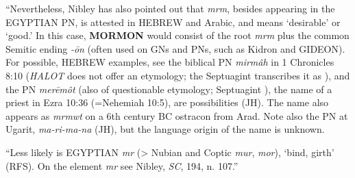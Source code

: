 			``Nevertheless, Nibley has also pointed out that \textit{mrm}, besides appearing in the \textsc{EGYPTIAN} PN, is attested in \textsc{HEBREW} and Arabic, and means `desirable' or `good.' In this case, \textbf{\textsc{MORMON}} would consist of the root \textit{mrm} plus the common Semitic ending \textit{-\={o}n} (often used on GNs and PNs, such as Kidron and \textsc{GIDEON}). For possible, \textsc{HEBREW} examples, see the biblical PN \textit{mirm\^{a}h} in 1 Chronicles 8:10 (\textit{HALOT} does not offer an etymology; the Septuagint transcribes it as ), and the PN \textit{mer\={e}m\^{o}t} (also of questionable etymology; Septuagint ), the name of a priest in Ezra 10:36 (=Nehemiah 10:5), are possibilities (JH). The name also appears as \textit{mrmwt} on a 6th century BC ostracon from Arad. Note also the PN at Ugarit, \textit{ma-ri-ma-na} (JH), but the language origin of the name is unknown.

			``Less likely is \textsc{EGYPTIAN} \textit{mr} (> Nubian and Coptic \textit{mur}, \textit{mor}), `bind, girth' (RFS). On the element \textit{mr} see Nibley, \textit{SC}, 194, n. 107.''